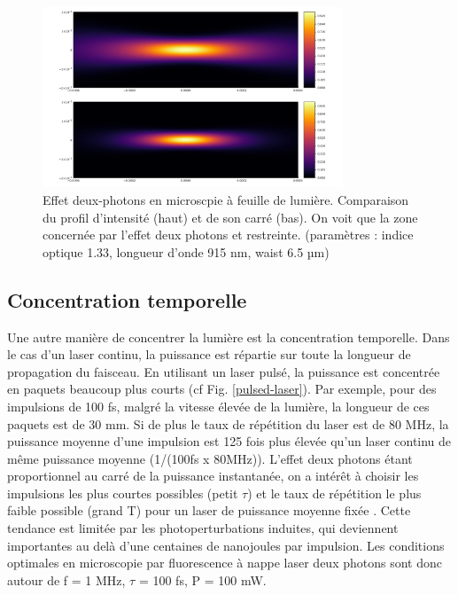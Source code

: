 \begin{figure}
\centering
\includegraphics[width=0.8\textwidth]{./files/profile-intensity.png}
\caption{Effet deux-photons en microscpie à feuille de lumière. Comparaison du profil d'intensité (haut) et de son carré (bas). On voit que la zone concernée par l'effet deux photons et restreinte. (paramètres : indice optique 1.33, longueur d'onde 915 nm, waist 6.5 µm)
}
\label{2P-intensity-profile}
\end{figure}

\subsection{Concentration temporelle}

Une autre manière de concentrer la lumière est la concentration temporelle. Dans le cas d'un laser continu, la puissance est répartie sur toute la longueur de propagation du faisceau. En utilisant un laser pulsé, la puissance est concentrée en paquets beaucoup plus courts (cf Fig. \ref{pulsed-laser}). Par exemple, pour des impulsions de 100 fs, malgré la vitesse élevée de la lumière, la longueur de ces paquets est de 30 mm. Si de plus le taux de répétition du laser est de 80 MHz, la puissance moyenne d'une impulsion est 125 fois plus élevée qu'un laser continu de même puissance moyenne (1/(100fs x 80MHz)). L'effet deux photons étant proportionnel au carré de la puissance instantanée, on a intérêt à choisir les impulsions les plus courtes possibles (petit $\tau$) et le taux de répétition le plus faible possible (grand T) pour un laser de puissance moyenne fixée \cite{maioli_fast_2020}. Cette tendance est limitée par les photoperturbations induites, qui deviennent importantes au delà d'une centaines de nanojoules par impulsion. Les conditions optimales en microscopie par fluorescence à nappe laser deux photons sont donc autour de f = 1 MHz, $\tau$ = 100 fs, P = 100 mW.

